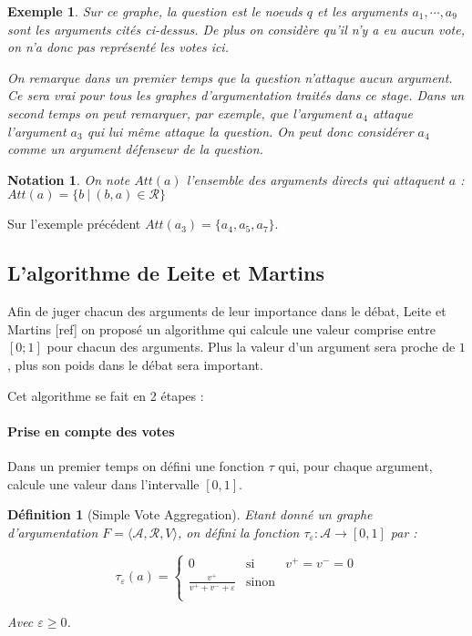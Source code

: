 \documentclass[11pt]{article}
\theoremstyle{defi}
\newtheorem{definition}{Définition}[section]
\theoremstyle{not}
\newtheorem{notation}{Notation}[section]
\theoremstyle{prob}
\newtheorem{example}{Exemple}[section]
\begin{document}
\begin{example}
      Sur ce graphe, la question est le noeuds $q$ et les arguments $a_1, \cdots, a_9$ sont les arguments cités ci-dessus.
      De plus on considère qu'il n'y a eu aucun vote, on n'a donc pas représenté les votes ici.

      On remarque dans un premier temps que la question n'attaque aucun argument.
      Ce sera vrai pour tous les graphes d'argumentation traités dans ce stage.
      Dans un second temps on peut remarquer, par exemple, que l'argument $a_4$ attaque l'argument $a_3$ qui lui même attaque la question.
      On peut donc considérer $a_4$ comme un argument défenseur de la question.

    \end{example}

    \begin{notation}
      On note $Att(a)$ l'ensemble des arguments directs qui attaquent $a$ :
      $Att(a) = \{b\ |\ (b, a)\in \mathcal{R}\}$
    \end{notation}

    Sur l'exemple précédent $Att(a_3) = \{a_4, a_5, a_7\}$.

    \subsection{L'algorithme de Leite et Martins}
      Afin de juger chacun des arguments de leur importance dans le débat, Leite et Martins [ref] on proposé un algorithme qui calcule une valeur comprise entre $[0; 1]$ pour chacun des arguments. Plus la valeur d'un argument sera proche de $1$, plus son poids dans le débat sera important.

      Cet algorithme se fait en 2 étapes :

      \paragraph{Prise en compte des votes}
      Dans un premier temps on défini une fonction $\tau$ qui, pour chaque argument, calcule une valeur dans l'intervalle $[0, 1]$.

        \begin{definition}[Simple Vote Aggregation]
          Etant donné un graphe d'argumentation $F = \langle \mathcal{A}, \mathcal{R}, V \rangle$, on défini la fonction $\tau_\varepsilon : \mathcal{A} \rightarrow [0, 1]$ par :

          $$\tau_\varepsilon(a) = \left\{
            \begin{array}{lll}
              0 & \mbox{si } & v^+ = v^- = 0\\
              \frac{v^+}{v^+ + v^- + \varepsilon} & \mbox{sinon} & \\
            \end{array}\right.$$

          Avec $\varepsilon \geq 0$.
        \end{definition}
\end{document}
